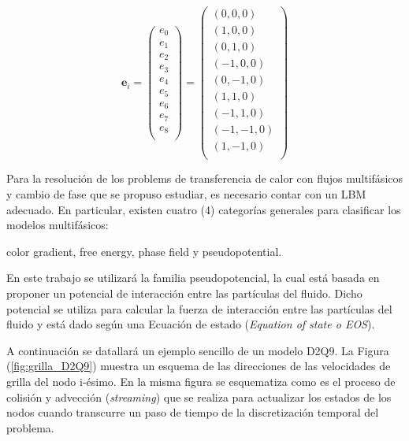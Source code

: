 \begin{equation}
{\mathbf{e}_{i}} =  
\left( \begin{array}{c} 
e_{0} \\ e_{1}\\ e_{2}\\ e_{3}\\ e_{4}\\ e_{5}\\
e_{6}\\ e_{7}\\ e_{8}\\
\end{array}
\right) =
\left( \begin{array}{c} 
( 0, 0, 0) \\ ( 1, 0, 0) \\ ( 0, 1, 0) \\(-1, 0, 0) \\ ( 0,-1, 0) \\ ( 1, 1, 0) \\
(-1, 1, 0) \\ (-1,-1, 0) \\ ( 1,-1, 0)\\ 
\end{array}
\right) 
\label{eq:velgrilla}
\end{equation}

Para la resolución de los problems de transferencia de calor con flujos multifásicos y cambio de fase que se propuso estudiar, es necesario contar con un LBM adecuado. En particular, existen cuatro (4) categorías generales para clasificar los modelos multifásicos:

\qquad \qquad color gradient, free energy, phase field y pseudopotential.

En este trabajo se utilizará la familia pseudopotencial, la cual está basada en proponer un potencial de interacción entre las partículas del fluido. Dicho potencial se utiliza para calcular la fuerza de interacción entre las partículas del fluido y está dado según una Ecuación de estado (\textit{Equation of state o EOS}). 

A continuación se datallará un ejemplo sencillo de un modelo D2Q9. La Figura (\ref{fig:grilla_D2Q9}) muestra un esquema de las direcciones de las velocidades de grilla del nodo i-ésimo. En la misma figura se esquematiza como  es el proceso de colisión y advección (\textit{streaming}) que se realiza para actualizar los estados de los nodos cuando transcurre un paso de tiempo de la discretización temporal del problema. 


